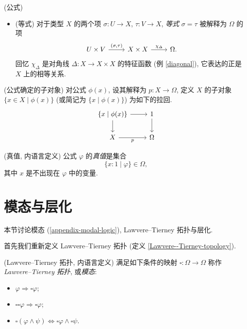 \begin{definition}
	{(公式)}
	\begin{itemize}
		\item
		(等式) 对于类型 $X$ 的两个项 $\sigma\colon U \to X$, $\tau\colon V \to X$, \emph{等式} $\sigma = \tau$ 被解释为 $\Omega$ 的项
		\[\begin{tikzcd}[ampersand replacement=\&]
			{U\times V} \& {X\times X} \& \Omega.
			\arrow["{(\sigma,\tau)}", from=1-1, to=1-2]
			\arrow["{\chi_{\Delta}}", from=1-2, to=1-3]
		\end{tikzcd}\]
		回忆 $\chi_{\Delta}$ 是对角线 $\Delta\colon X\to X\times X$ 的特征函数 (例 \ref{diagonal}), 它表达的正是 $X$ 上的相等关系.
	\end{itemize}
\end{definition}

\begin{definition}
	{(公式确定的子对象)}
	对公式 $\phi(x)$, 设其解释为 $p\colon X\to\Omega$, 定义 $X$ 的子对象 $\{x\in X \mid \phi(x)\}$ (或简记为 $\{x\mid \phi(x)\}$) 为如下的拉回.
	\[
	\begin{tikzcd}
		\{x\mid \phi(x)\}\ar[r]\ar[d] & 1\ar[d] \\
		X \ar[r,"p"'] & \Omega
	\end{tikzcd}
	\]
\end{definition}

\begin{definition}
	{(真值, 内语言定义)}
	公式 $\varphi$ 的\emph{真值}是集合
	$$
	\{x:1 \mid \varphi\} \in \Omega,
	$$
	其中 $x$ 是不出现在 $\varphi$ 中的变量.
\end{definition}

\section{模态与层化}

本节讨论模态 (\ref{appendix-modal-logic}), Lawvere--Tierney 拓扑与层化.

首先我们重新定义 Lawvere--Tierney 拓扑 (定义 \ref{Lawvere--Tierney-topology}).

\begin{definition}
	{(Lawvere--Tierney 拓扑, 内语言定义)}
	满足如下条件的映射 $\square\colon \Omega\to\Omega$ 称作\emph{Lawvere--Tierney 拓扑}, 或\emph{模态}:
	\begin{itemize}
		\item $\varphi\Rightarrow \square \varphi$;
		\item $\square\square\varphi \Rightarrow \square\varphi$;
		\item $\square(\varphi \land \psi) \Leftrightarrow \square\varphi\land \square\psi$.
	\end{itemize}
\end{definition}

